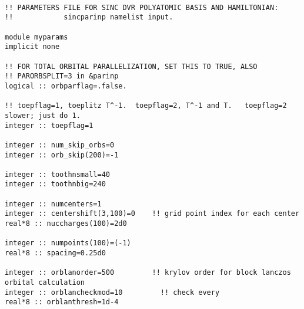 \begin{verbatim}

!! PARAMETERS FILE FOR SINC DVR POLYATOMIC BASIS AND HAMILTONIAN:
!!            sincparinp namelist input.

module myparams
implicit none

!! FOR TOTAL ORBITAL PARALLELIZATION, SET THIS TO TRUE, ALSO
!! PARORBSPLIT=3 in &parinp
logical :: orbparflag=.false.

!! toepflag=1, toeplitz T^-1.  toepflag=2, T^-1 and T.   toepflag=2 slower; just do 1.
integer :: toepflag=1

integer :: num_skip_orbs=0
integer :: orb_skip(200)=-1

integer :: toothnsmall=40
integer :: toothnbig=240

integer :: numcenters=1
integer :: centershift(3,100)=0    !! grid point index for each center
real*8 :: nuccharges(100)=2d0

integer :: numpoints(100)=(-1)
real*8 :: spacing=0.25d0

integer :: orblanorder=500         !! krylov order for block lanczos orbital calculation
integer :: orblancheckmod=10         !! check every
real*8 :: orblanthresh=1d-4

\end{verbatim}
